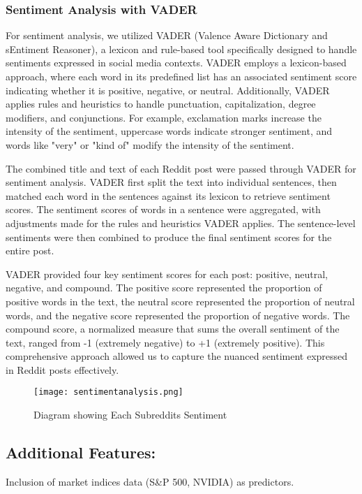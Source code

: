 \subsubsection{Sentiment Analysis with VADER}
For sentiment analysis, we utilized VADER (Valence Aware Dictionary and sEntiment Reasoner), a lexicon and rule-based tool specifically designed to handle sentiments expressed in social media contexts. VADER employs a lexicon-based approach, where each word in its predefined list has an associated sentiment score indicating whether it is positive, negative, or neutral. Additionally, VADER applies rules and heuristics to handle punctuation, capitalization, degree modifiers, and conjunctions. For example, exclamation marks increase the intensity of the sentiment, uppercase words indicate stronger sentiment, and words like "very" or "kind of" modify the intensity of the sentiment.

The combined title and text of each Reddit post were passed through VADER for sentiment analysis. VADER first split the text into individual sentences, then matched each word in the sentences against its lexicon to retrieve sentiment scores. The sentiment scores of words in a sentence were aggregated, with adjustments made for the rules and heuristics VADER applies. The sentence-level sentiments were then combined to produce the final sentiment scores for the entire post.

VADER provided four key sentiment scores for each post: positive, neutral, negative, and compound. The positive score represented the proportion of positive words in the text, the neutral score represented the proportion of neutral words, and the negative score represented the proportion of negative words. The compound score, a normalized measure that sums the overall sentiment of the text, ranged from -1 (extremely negative) to +1 (extremely positive). This comprehensive approach allowed us to capture the nuanced sentiment expressed in Reddit posts effectively.

\begin{figure}[h]
    \centering
    \texttt{[image: sentimentanalysis.png]}
    \caption{Diagram showing Each Subreddits Sentiment}
    \label{fig:Sentiment}
\end{figure}


\subsection{Additional Features:} Inclusion of market indices data (S\&P 500, NVIDIA) as predictors.


